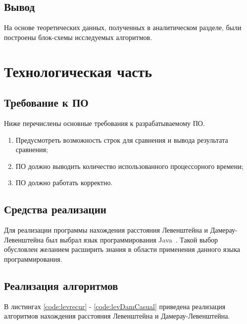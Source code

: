 \documentclass[12pt]{report}
\begin{document}
    \section{Вывод}
    На основе теоретических данных, полученных в аналитическом разделе,
    были построены блок-схемы исследуемых алгоритмов.


    \chapter{Технологическая часть}


    \section{Требование к ПО}
    Ниже перечислены основные требования к разрабатываемому ПО.
    \begin{enumerate}
        \item Предусмотреть возможность строк для сравнения и вывода результата сравнения;
        \item ПО должно выводить количество использованного процессорного времени;
        \item ПО должно работать корректно.
    \end{enumerate}


    \section{Средства реализации}
    Для реализации программы нахождения расстояния Левенштейна и Дамерау-Левенштейна
    был выбрал язык программирования Java~\cite{java}. Такой выбор обусловлен желанием
    расширить знания в области применения данного языка программирования.


    \section{Реализация алгоритмов}
    В листингах \ref{code:levrecur} - \ref{code:levDamCasual}
    приведена реализация алгоритмов нахождения расстояния Левенштейна и Дамерау-Левенштейна.
\end{document}
